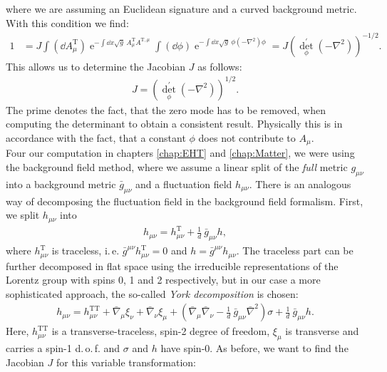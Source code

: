 where we are assuming an Euclidean signature and a curved background metric. With this condition we find:
\begin{align}
	1&=J \int\left(\dd A_{\mu}^{\mathrm{T}}\right) \operatorname{e}^{-\int \dd x \sqrt{g} \ A_{\mu}^{\mathrm{T}} A^{\mathrm{T}, \mu}} 
	\int(\dd\phi) \operatorname{e}^{-\int \dd x \sqrt{g} \  \phi\left(-\nabla^{2}\right) \phi} = J\left(\operatorname{det}_{\phi}^{\prime}\left(-\nabla^{2}\right)\right)^{-1/2}.
\end{align}
This allows us to determine the Jacobian $J$ as follows:
\begin{align}
	J = \left(\operatorname{det}_{\phi}^{\prime}\left(-\nabla^{2}\right)\right)^{1/2}.
\end{align}
The prime denotes the fact, that the zero mode has to be removed, when computing the determinant to obtain a consistent result. Physically this is in accordance with the fact, that a constant $\phi$ does not contribute to $A_{\mu}$.\\
Four our computation in chapters \ref{chap:EHT} and \ref{chap:Matter}, we were using the background field method, where we assume a linear split of the \textit{full} metric $g_{\mu\nu}$ into a background metric $\bar{g}_{\mu\nu}$ and a fluctuation field $h_{\mu\nu}$. There is an analogous way of decomposing the fluctuation field in the background field formalism. First, we split $h_{\mu\nu}$ into
\begin{align}
	h_{\mu\nu} = h_{\mu\nu}^{\mathrm{T}} + \frac{1}{d}\ \bar{g}_{\mu\nu}h,
\end{align} 
where $h_{\mu\nu}^{\mathrm{T}}$ is traceless, i.\,e. $\bar{g}^{\mu\nu}h_{\mu\nu}^{\mathrm{T}}=0$ and $h=\bar{g}^{\mu\nu}h_{\mu\nu}$. The traceless part can be further decomposed in flat space using the irreducible representations of the Lorentz group with spins 0, 1 and 2 respectively, but in our case a more sophisticated approach, the so-called \textit{York decomposition} is chosen:
\begin{align}
	h_{\mu\nu} = h_{\mu\nu}^{\text{TT}} + \bar{\nabla}_{\mu}\xi_{\nu} + \bar{\nabla}_{\nu}\xi_{\mu} + \left(\bar{\nabla}_{\mu}\bar{\nabla}_{\nu} - \frac{1}{d} \ \bar{g}_{\mu\nu}\bar{\nabla}^2\right)\sigma + \frac{1}{d} \ \bar{g}_{\mu\nu}h.
\end{align}
Here, $ h_{\mu\nu}^{\text{TT}}$ is a transverse-traceless, spin-2 degree of freedom, $\xi_{\mu}$ is transverse and carries a spin-1 d.\,o.\,f. and $\sigma$ and $h$ have spin-0. As before, we want to find the Jacobian $J$ for this variable transformation:
